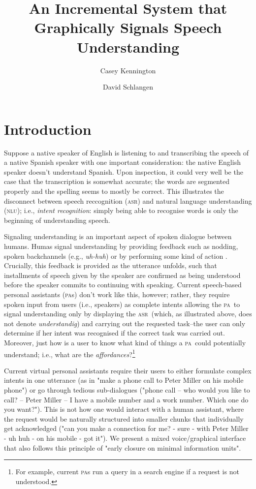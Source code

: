 \documentclass[11pt]{article}
\title{An Incremental System that Graphically Signals Speech Understanding}
\author{Casey Kennington \and David Schlangen}
\newcommand{\nlu}[0]{\textsc{nlu}}
\newcommand{\asr}[0]{\textsc{asr}}
\newcommand{\pa}[0]{\textsc{pa}}
\begin{document}

\maketitle

\begin{abstract}

\end{abstract}

\section{Introduction}
\label{section:intro}

Suppose a native speaker of English is listening to and transcribing the speech of a native Spanish speaker with one important consideration: the native English speaker doesn't understand Spanish. Upon inspection, it could very well be the case that the transcription is somewhat accurate; the words are segmented properly and the spelling seems to mostly be correct. This illustrates the disconnect between speech reccognition (\asr) and natural language understanding (\nlu); i.e., \emph{intent recognition}: simply being able to recognise words is only the beginning of understanding speech. 

Signaling understanding is an important aspect of spoken dialogue between humans. Humas signal understanding by providing feedback such as nodding, spoken backchannels (e.g., \emph{uh-huh}) or by performing some kind of action \cite{Clark1996}. Crucially, this feedback is provided as the utterance unfolds, such that installments of speech given by the speaker are confirmed as being understood before the speaker commits to continuing with speaking. Current speech-based personal assistants (\pa s) don't work like this, however; rather, they require spoken input from users (i.e., speakers) as complete intents allowing the \pa\ to signal understanding only by displaying the \asr\ (which, as illustrated above, does not denote \emph{understandig}) and carrying out the requested task--the user can only determine if her intent was recognised if the correct task was carried out. Moreover, just how is a user to know what kind of things a \pa\ could potentially understand; i.e., what are the \emph{affordances}?\footnote{For example, current \pa s run a query in a search engine if a request is not understood.}

Current virtual personal assistants require their users to either formulate complex intents in one utterance (as in "make a phone call to Peter Miller on his mobile phone") or go through tedious sub-dialogues ("phone call -- who would you like to call? -- Peter Miller -- I have a mobile number and a work number. Which one do you want?"). This is not how one would interact with a human assistant, where the request would be naturally structured into smaller chunks that individually get acknowledged ("can you make a connection for me? - sure - with Peter Miller - uh huh - on his mobile - got it"). We present a mixed voice/graphical interface that also follows this principle of "early closure on minimal information units".
\end{document}
